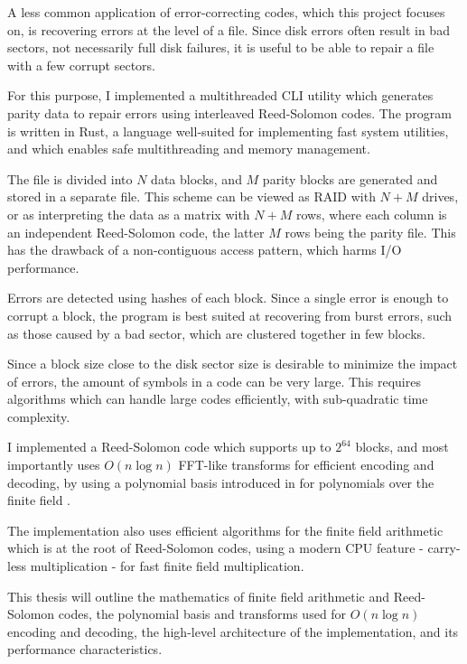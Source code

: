 A less common application of error-correcting codes, which this project focuses on, is recovering errors at the level of a file.
Since disk errors often result in bad sectors, not necessarily full disk failures, it is useful to be able to repair a file with a few corrupt sectors.

For this purpose, I implemented a multithreaded CLI utility which generates parity data to repair errors using interleaved Reed-Solomon codes.
The program is written in Rust, a language well-suited for implementing fast system utilities, and which enables safe multithreading and memory management.

The file is divided into $N$ data blocks, and $M$ parity blocks are generated and stored in a separate file.
This scheme can be viewed as RAID with $N + M$ drives, or as interpreting the data as a matrix with $N + M$ rows, where each column is an independent Reed-Solomon code, the latter $M$ rows being the parity file.
This has the drawback of a non-contiguous access pattern, which harms I/O performance.

Errors are detected using hashes of each block.
Since a single error is enough to corrupt a block, the program is best suited at recovering from burst errors, such as those caused by a bad sector, which are clustered together in few blocks.

Since a block size close to the disk sector size is desirable to minimize the impact of errors, the amount of symbols in a code can be very large.
This requires algorithms which can handle large codes efficiently, with sub-quadratic time complexity.

I implemented a Reed-Solomon code which supports up to $2^{64}$ blocks, and most importantly uses $O(n \log n)$ FFT-like transforms for efficient encoding and decoding,
by using a polynomial basis introduced in \cite{novel-poly} for polynomials over the finite field .

The implementation also uses efficient algorithms for the finite field arithmetic which is at the root of Reed-Solomon codes, using a modern CPU feature - carry-less multiplication \cite{intel-clmul} - for fast finite field multiplication.

This thesis will outline the mathematics of finite field arithmetic and Reed-Solomon codes, the polynomial basis and transforms used for $O(n \log n)$ encoding and decoding, the high-level architecture of the implementation, and its performance characteristics.
